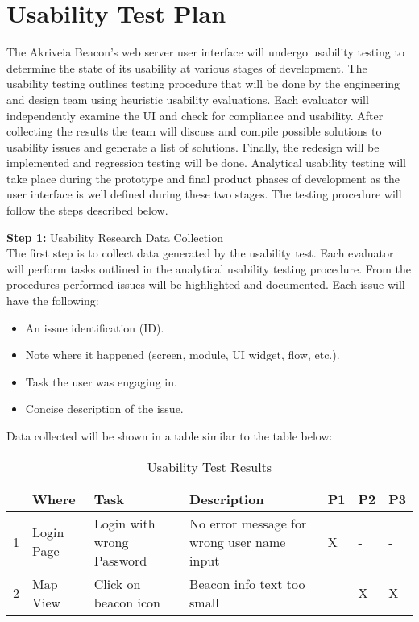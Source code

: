 

\setcounter{section}{5}
\section{Usability Test Plan}
\bigskip
The Akriveia Beacon’s web server user interface will undergo usability testing to determine the state of its usability at various stages of development. The usability testing outlines testing procedure that will be done by the engineering and design team using heuristic usability evaluations. Each evaluator will independently examine the UI and check for compliance and usability. After collecting the results the team will discuss and compile possible solutions to usability issues and generate a list of solutions. Finally, the redesign will be implemented and regression testing will be done. Analytical usability testing will take place during the prototype and final product phases of development as the user interface is well defined during these two stages. The testing procedure will follow the steps described below.

\bigskip

\textbf{Step 1:} Usability Research Data Collection\\
\medskip
The first step is to collect data generated by the usability test. Each evaluator will perform tasks outlined in the analytical usability testing procedure. From the procedures performed issues will be highlighted and documented. Each issue will have the following:
\begin{itemize}
\setlength\itemsep{0.1mm}
	\item An issue identification (ID).
	\item Note where it happened (screen, module, UI widget, flow, etc.).
	\item Task the user was engaging in.
	\item Concise description of the issue.
\end{itemize}
Data collected will be shown in a table similar to the table below:

\def\arraystretch{1.5}
\begin{table}[H]
\centering
\begin{tabular}{ | p{0.5cm} | p{2cm}| p{5cm} | p{5cm} | p{0.5cm} | p{0.5cm} | p{0.5cm}|} 
\hline

\rowcolor{lightgray} \multicolumn{1}{|l|}{\textbf{ID}} & \textbf{Where} & \textbf{Task} &  \textbf{Description} & \textbf{P1} & \textbf{P2} & \textbf{P3} \\ 
\hline
1 & Login Page & Login with wrong Password & No error message for wrong user name input & X & - & - \\
\hline
2 & Map View & Click on beacon icon & Beacon info text too small & - & X & X \\
\hline
\end{tabular}
\caption{Usability Test Results}
\end{table}	



